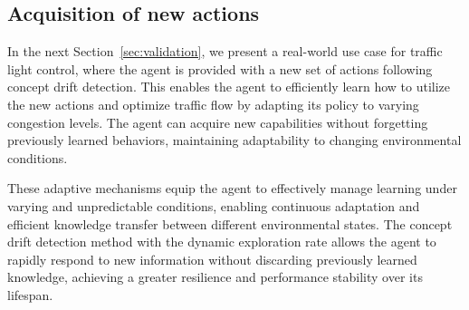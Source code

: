 \subsection{Acquisition of new actions}
In the next Section~\ref{sec:validation}, we present a real-world use case for traffic light control, where the agent is provided with a new set of actions following concept drift detection. This enables the agent to efficiently learn how to utilize the new actions and optimize traffic flow by adapting its policy to varying congestion levels. The agent can acquire new capabilities without forgetting previously learned behaviors, maintaining adaptability to changing environmental conditions.

These adaptive mechanisms equip the agent to effectively manage learning under varying and unpredictable conditions, enabling continuous adaptation and efficient knowledge transfer between different environmental states. The concept drift detection method with the dynamic exploration rate allows the agent to rapidly respond to new information without discarding previously learned knowledge, achieving a greater resilience and performance stability over its lifespan. 


\endinput

